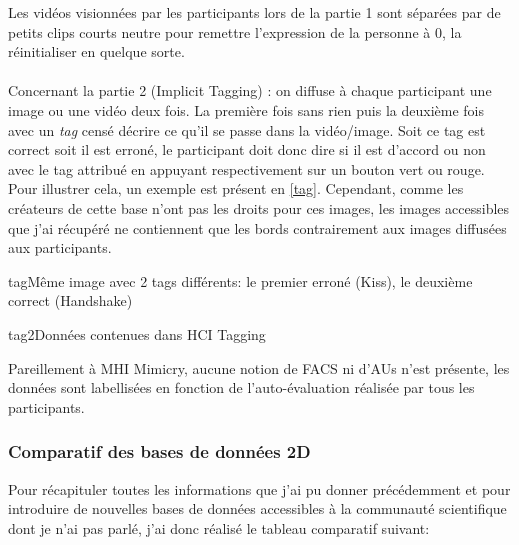 \documentclass[poster]{polytech/polytech}
\begin{document}
Les vidéos visionnées par les participants lors de la partie 1 sont séparées par de petits clips courts neutre pour remettre l'expression de la personne à 0, la réinitialiser en quelque sorte.\\
\\
Concernant la partie 2 (Implicit Tagging) : on diffuse à chaque participant une image ou une vidéo deux fois. La première fois sans rien puis la deuxième fois avec un \textit{tag} censé décrire ce qu'il se passe dans la vidéo/image. Soit ce tag est correct soit il est erroné, le participant doit donc dire si il est d'accord ou non avec le tag attribué en appuyant respectivement sur un bouton vert ou rouge. Pour illustrer cela, un exemple est présent en \autoref{tag}. Cependant, comme les créateurs de cette base n'ont pas les droits pour ces images, les images accessibles que j'ai récupéré ne contiennent que les bords contrairement aux images diffusées aux participants.\\

\begin{Figure}{tag}{Même image avec 2 tags différents: le premier erroné (Kiss), le deuxième correct (Handshake)}
\end{Figure}

\begin{Figure}{tag2}{Données contenues dans HCI Tagging}
\end{Figure}

Pareillement à MHI Mimicry, aucune notion de FACS ni d'AUs n'est présente, les données sont labellisées en fonction de l'auto-évaluation réalisée par tous les participants.

\newpage
\subsubsection{Comparatif des bases de données 2D}
Pour récapituler toutes les informations que j'ai pu donner précédemment et pour introduire de nouvelles bases de données accessibles à la communauté scientifique dont je n'ai pas parlé, j'ai donc réalisé le tableau comparatif suivant:
\end{document}
